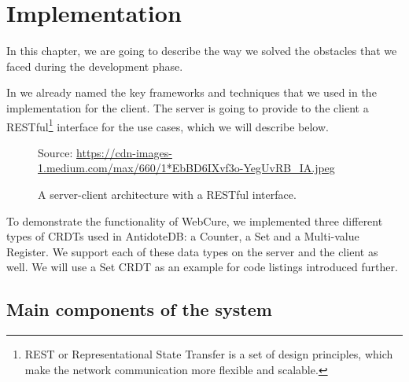 \chapter{Implementation}
\label{Implementation}

In this chapter, we are going to describe the way we solved the obstacles that we faced during the development phase.

In  we already named the key frameworks and techniques that we used in the implementation for the client. The server is going to provide to the client a RESTful\footnote{REST or Representational State Transfer is a set of design principles, which make the network communication more flexible and scalable\cite{40}.} interface for the use cases, which we will describe below.

\begin{figure}[!htb]
    \begin{center}
    \setlength{\fboxsep}{4pt}%
    \setlength{\fboxrule}{1pt}%
    {\scriptsize%
     Source: \url{https://cdn-images-1.medium.com/max/660/1*EbBD6IXvf3o-YegUvRB_IA.jpeg}}
    \caption {A server-client architecture with a RESTful interface.}
    \label{fig:design1}
\end{center}
\end{figure}

To demonstrate the functionality of WebCure, we implemented three different types of CRDTs used in AntidoteDB: a Counter, a Set and a Multi-value Register. We support each of these data types on the server and the client as well. We will use a Set CRDT as an example for code listings introduced further.

\section{Main components of the system}
\label{sysmaincomponents}

